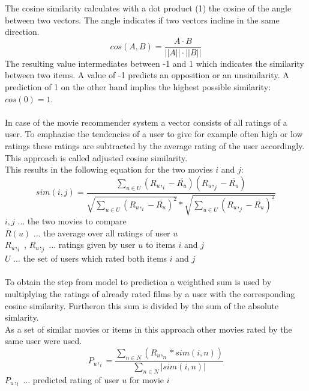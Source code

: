 \documentclass[a4paper,12pt,twoside]{article}
\begin{document}
The cosine similarity calculates with a dot product (1) the cosine of the angle between two vectors.
The angle indicates if two vectors incline in the same direction.
\begin{equation}
cos(A, B) = \frac { A \cdot  B}{|| A|| \cdot || B||}
\end{equation}
The resulting value intermediates between -1 and 1 which indicates the similarity between two items. A value of -1 predicts an opposition or an unsimilarity. A prediction of 1 on the other hand implies the highest possible similarity: $cos(0) = 1$. \\
\\
In case of the movie recommender system a vector consists of all ratings of a user. To emphazise the tendencies of a user to give for example often high or low ratings these ratings are subtracted by the average rating of the user accordingly. This approach is called adjusted cosine similarity.\\  
This results in the following equation for the two movies $i$ and $j$:\\
\begin{equation}
sim (i,j) = 
\frac{
	\displaystyle\sum_{u \in U} (R_u,_i - \overline{R_u})(R_u,_j - \overline{R_u})
}
{
	\sqrt{ \displaystyle\sum_{u \in U} (R_u,_i - \overline{R_u})^2} 
	* \sqrt{\displaystyle\sum_{u \in U} (R_u,_j - \overline{R_u})^2}
}
\end{equation}
$ i,j$ ... the two movies to compare \\
$\overline{R}(u)$ ... the average over all ratings of user $u$ \\
$R_u,_i$ , $R_u,_j$  ... ratings given by user $u$ to items $i$ and $j$\\
$U$ ... the set of users which rated both items $i$ and $j$\\
\\
To obtain the step from model to prediction a weighthed sum is used by multiplying the ratings of already rated films by a user with the corresponding cosine similarity. Furtheron this sum is divided by the sum of the absolute simlarity. \\ 
As a set of similar movies or items in this approach other movies rated by the same user were used.\cite{sarwar} 
\begin{equation}
P_u,_i = \frac{
\displaystyle\sum_{n \in N}(R_u,_n*sim(i,n))
}{
\displaystyle\sum_{n \in N}|sim(i,n)|
}
\end{equation}
$P_u,_i$ ... predicted rating of user $u$ for movie $i$\\
\end{document}
